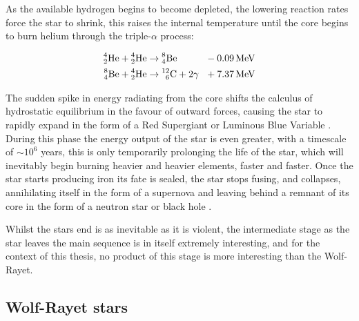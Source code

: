 As the available hydrogen begins to become depleted, the lowering reaction rates force the star to shrink, this raises the internal temperature until the core begins to burn helium through the triple-$\alpha$ process:

\begin{equation}
  \begin{alignedat}{3}
    \atom{He}{4}{2} + \atom{He}{4}{2} & \rightarrow \atom{Be}{8}{4} && ~~ - \SI{0.09}{\mega\electronvolt} \\
    \atom{Be}{8}{4} + \atom{He}{4}{2} & \rightarrow \atom{C}{12}{6} + 2\gamma && ~~ + \SI{7.37}{\mega\electronvolt} 
  \end{alignedat}
\end{equation}

\noindent
The sudden spike in energy radiating from the core shifts the calculus of hydrostatic equilibrium in the favour of outward forces, causing the star to rapidly expand in the form of a Red Supergiant or Luminous Blue Variable \parencite{ryanStellarEvolutionNucleosynthesis2010a}.
During this phase the energy output of the star is even greater, with a timescale of $\sim 10^6$ years, this is only temporarily prolonging the life of the star, which will inevitably begin burning heavier and heavier elements, faster and faster.
Once the star starts producing iron its fate is sealed, the star stops fusing, and collapses, annihilating itself in the form of a supernova and leaving behind a remnant of its core in the form of a neutron star or black hole 
\parencite{ward-thompsonIntroductionStarFormation2011}.

Whilst the stars end is as inevitable as it is violent, the intermediate stage as the star leaves the main sequence is in itself extremely interesting, and for the context of this thesis, no product of this stage is more interesting than the Wolf-Rayet.

\subsection{Wolf-Rayet stars}
\label{sec:wrtype}

